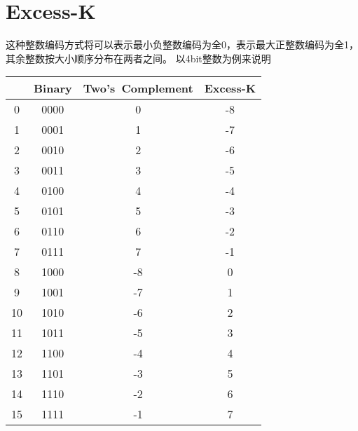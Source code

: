 \section{Excess-K}
这种整数编码方式将可以表示最小负整数编码为全0，表示最大正整数编码为全1，其余整数按大小顺序分布在两者之间。
以4bit整数为例来说明
\begin{center}
    \begin{tabular}{|c|c|c|c|} \hline
    \hbox{} & \hbox{Binary} & \hbox{Two's Complement} & \hbox{Excess-K} \\ \hline
    \hbox{0} & \hbox{0000} & \hbox{0}  & \hbox{-8} \\ \hline
    \hbox{1} & \hbox{0001} & \hbox{1}  & \hbox{-7} \\ \hline
    \hbox{2} & \hbox{0010} & \hbox{2}  & \hbox{-6} \\ \hline
    \hbox{3} & \hbox{0011} & \hbox{3}  & \hbox{-5} \\ \hline
    \hbox{4} & \hbox{0100} & \hbox{4}  & \hbox{-4} \\ \hline
    \hbox{5} & \hbox{0101} & \hbox{5}  & \hbox{-3} \\ \hline
    \hbox{6} & \hbox{0110} & \hbox{6}  & \hbox{-2} \\ \hline
    \hbox{7} & \hbox{0111} & \hbox{7}  & \hbox{-1} \\ \hline
    \hbox{8} & \hbox{1000} & \hbox{-8}  & \hbox{0} \\ \hline
    \hbox{9} & \hbox{1001} & \hbox{-7}  & \hbox{1} \\ \hline
    \hbox{10} & \hbox{1010} & \hbox{-6}  & \hbox{2} \\ \hline
    \hbox{11} & \hbox{1011} & \hbox{-5}  & \hbox{3} \\ \hline
    \hbox{12} & \hbox{1100} & \hbox{-4}  & \hbox{4} \\ \hline
    \hbox{13} & \hbox{1101} & \hbox{-3}  & \hbox{5} \\ \hline
    \hbox{14} & \hbox{1110} & \hbox{-2}  & \hbox{6} \\ \hline
    \hbox{15} & \hbox{1111} & \hbox{-1}  & \hbox{7} \\ \hline
    \end{tabular}
\end{center}


